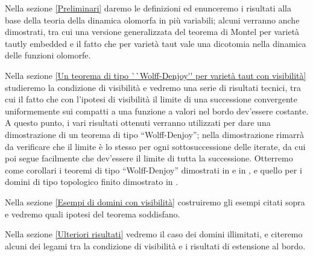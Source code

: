 Nella sezione \ref{Preliminari} daremo le definizioni ed enunceremo i risultati alla base della teoria della dinamica olomorfa in più variabili; alcuni verranno anche dimostrati, tra cui una versione generalizzata del teorema di Montel per varietà tautly embedded e il fatto che per varietà taut vale una dicotomia nella dinamica delle funzioni olomorfe.

Nella sezione \ref{Un teorema di tipo ``Wolff-Denjoy'' per varietà taut con visibilità} studieremo la condizione di visibilità e vedremo una serie di risultati tecnici, tra cui il fatto che con l'ipotesi di visibilità il limite di una successione convergente uniformemente sui compatti a una funzione a valori nel bordo dev'essere costante. A questo punto, i vari risultati ottenuti verranno utilizzati per dare una dimostrazione di un teorema di tipo ``Wolff-Denjoy''; nella dimostrazione rimarrà da verificare che il limite è lo stesso per ogni sottosuccessione delle iterate, da cui poi segue facilmente che dev'essere il limite di tutta la successione. Otterremo come corollari i teoremi di tipo ``Wolff-Denjoy'' dimostrati in \cite{A2} e in \cite{CMS}, e quello per i domini di tipo topologico finito dimostrato in \cite{BM}.

Nella sezione \ref{Esempi di domini con visibilità} costruiremo gli esempi citati sopra e vedremo quali ipotesi del teorema soddisfano.

Nella sezione \ref{Ulteriori risultati} vedremo il caso dei domini illimitati, e citeremo alcuni dei legami tra la condizione di visibilità e i risultati di estensione al bordo.